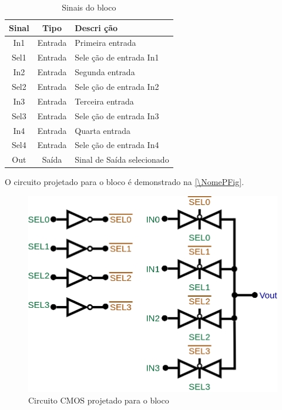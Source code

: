 \begin{table}[htbp]
\caption{Sinais do bloco \NomeBloco}
\label{\NomeSTab}
\centering
\begin{tabular}{ccl}

    \toprule
    Sinal & Tipo    & Descri ção        \\
    \midrule \midrule
    In1    & Entrada & Primeira entrada \\
    \midrule
    Sel1    & Entrada & Sele ção de entrada In1 \\
    \midrule
    In2    & Entrada & Segunda entrada \\
    \midrule
    Sel2    & Entrada & Sele ção de entrada In2 \\
    \midrule
    In3    & Entrada & Terceira entrada \\
    \midrule
    Sel3    & Entrada & Sele ção de entrada In3 \\
    \midrule
    In4    & Entrada & Quarta entrada \\
    \midrule
    Sel4    & Entrada & Sele ção de entrada In4 \\
    \midrule
    Out   & Saída   & Sinal de Sa\'ida selecionado   \\
    \bottomrule
\end{tabular}
\end{table}

O circuito projetado para o bloco \'e demonstrado na \autoref{\NomePFig}.

\begin{figure}[htb]
 \label{NomePFig}
 \centering
    \centering
    \caption{Circuito CMOS projetado para o bloco \NomeBloco} \label{\NomePFig}
    \includegraphics[scale=0.3]{Circuitos/sel4x1.png}
\end{figure}

